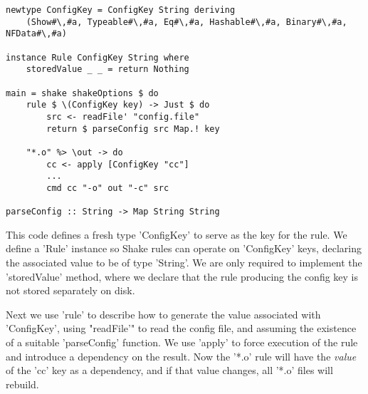 \begin{lstlisting}
newtype ConfigKey = ConfigKey String deriving
    (Show#\,#a, Typeable#\,#a, Eq#\,#a, Hashable#\,#a, Binary#\,#a, NFData#\,#a)

instance Rule ConfigKey String where
    storedValue _ _ = return Nothing

main = shake shakeOptions $ do
    rule $ \(ConfigKey key) -> Just $ do
        src <- readFile' "config.file"
        return $ parseConfig src Map.! key

    "*.o" %> \out -> do
        cc <- apply [ConfigKey "cc"]
        ...
        cmd cc "-o" out "-c" src

parseConfig :: String -> Map String String
\end{lstlisting}

This code defines a fresh type \lst'ConfigKey' to serve as the key for the rule.
We define a \lst'Rule' instance so Shake rules can operate on \lst'ConfigKey'
keys, declaring the associated value to be of type \lst'String'. We are only
required to implement the \lst'storedValue' method, where we declare that the
rule producing the config key is not stored separately on disk.

Next we use \lst'rule' to describe how to generate the value associated with
\lst'ConfigKey', using \lst"readFile'" to read the config file, and assuming the
existence of a suitable \lst'parseConfig' function. We use \lst'apply' to force
execution of the rule and introduce a dependency on the result.
Now the \lst'*.o' rule will have the \emph{value} of the
\lst'cc' key as a dependency, and if that value changes, all \lst'*.o' files will rebuild.

%
%
%
%

